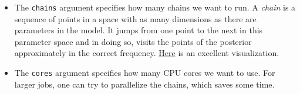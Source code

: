 \documentclass[
]{book}
\begin{document}
\begin{itemize}
\item
  The \texttt{chains} argument specifies how many chains we want to run.
  A \emph{chain} is a sequence of points in a space with as many dimensions as there
  are parameters in the model. It jumps from one point to the next in this parameter
  space and in doing so, visits the points of the posterior approximately in the correct
  frequency. \href{https://blog.revolutionanalytics.com/2013/09/an-animated-peek-into-the-workings-of-bayesian-statistics.html}{Here}
  is an excellent visualization.
\item
  The \texttt{cores} argument specifies how many CPU cores we want to use.
  For larger jobs, one can try to parallelize
  the chains, which saves some time.
\end{itemize}
\end{document}

